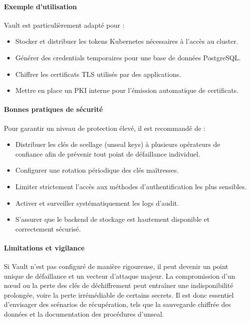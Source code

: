 \paragraph{Exemple d’utilisation}

Vault est particulièrement adapté pour :
\begin{itemize}
	\item Stocker et distribuer les tokens Kubernetes nécessaires à l’accès au cluster.
	\item Générer des credentials temporaires pour une base de données PostgreSQL.
	\item Chiffrer les certificats TLS utilisés par des applications.
	\item Mettre en place un PKI interne pour l’émission automatique de certificats.
\end{itemize}

\paragraph{Bonnes pratiques de sécurité}

Pour garantir un niveau de protection élevé, il est recommandé de :
\begin{itemize}
	\item Distribuer les clés de scellage (unseal keys) à plusieurs opérateurs de confiance afin de prévenir tout point de défaillance individuel.
	\item Configurer une rotation périodique des clés maîtresses.
	\item Limiter strictement l’accès aux méthodes d’authentification les plus sensibles.
	\item Activer et surveiller systématiquement les logs d’audit.
	\item S’assurer que le backend de stockage est hautement disponible et correctement sécurisé.
\end{itemize}

\paragraph{Limitations et vigilance}

Si Vault n’est pas configuré de manière rigoureuse, il peut devenir un point unique de défaillance et un vecteur d’attaque majeur. La compromission d’un nœud ou la perte des clés de déchiffrement peut entraîner une indisponibilité prolongée, voire la perte irrémédiable de certains secrets. Il est donc essentiel d’envisager des scénarios de récupération, tels que la sauvegarde chiffrée des données et la documentation des procédures d’unseal.

